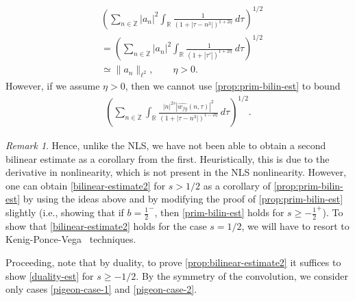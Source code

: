 \documentclass[12pt,reqno]{amsart}
\numberwithin{equation}{section}  %
\numberwithin{figure}{section}
\newcommand{\rr}{\mathbb{R}}
\newcommand{\zz}{\mathbb{Z}}
\newcommand{\zzdot}{\dot{\zz}}
\newcommand{\wh}{\widehat}
\theoremstyle{plain}
\theoremstyle{definition}
\theoremstyle{remark}
\newtheorem{remark}{Remark}
\begin{document}
\begin{equation*}
	\begin{split}
		& \left( \sum_{n \in \zzdot} | a_{n} |^2\int_{\rr} \frac{1}{\left( 1 + | \tau -
		n^3 | \right)^{1 + 2 \eta}} \ d \tau  
		\right)^{1/2} 
		\\
		& = \left ( \sum_{n \in \zzdot}
		| a_n |^2 
		\int_{\rr} \frac{1}{\left( 1 + | \tau' | \right)^{1 + 2 \eta}} \ d 
		\tau \right)^{1/2}
		\\
		& \simeq \|a_n\|_{\ell^2}, \qquad \eta >0.
		\end{split}
\end{equation*}
However, if we assume $\eta >0$, then
we cannot use \autoref{prop:prim-bilin-est} to bound
\begin{equation*}
	\begin{split}
		\left ( \sum_{n \in \zzdot}\int_{\rr} \frac{|n|^{2s} | \wh{w_{fg}}(n, \tau) 
		|^2}{\left( 1 + | \tau - n^3 | \right)^{1 - 2\eta}}\ d \tau
		\right)^{1/2}. 
	\end{split}
\end{equation*}
\begin{remark}
Hence, unlike the NLS, we have not been able to obtain a second bilinear
estimate as a corollary from the first. Heuristically, this is due to the
derivative in nonlinearity, which is not present in the NLS nonlinearity.
However, one can obtain \eqref{bilinear-estimate2} for $s>1/2$ as a
corollary of \autoref{prop:prim-bilin-est} by using the ideas
above and by modifying the proof of \autoref{prop:prim-bilin-est} slightly (i.e.,
showing that if $b = \frac{1}{2}^-$, then \eqref{prim-bilin-est} holds for
$s\ge-\frac{1}{2}^+$). To show that \eqref{bilinear-estimate2} holds for the
case $s=1/2$, we will have to resort to Kenig-Ponce-Vega~\cite{Kenig:1996aa} techniques.
\end{remark}
%
%
Proceeding, note that by duality, to prove \autoref{prop:bilinear-estimate2} it
suffices to show \eqref{duality-est} for $s \ge -1/2$. By the symmetry of the convolution, we
consider only cases \eqref{pigeon-case-1} and \eqref{pigeon-case-2}.
%
%
\end{document}
